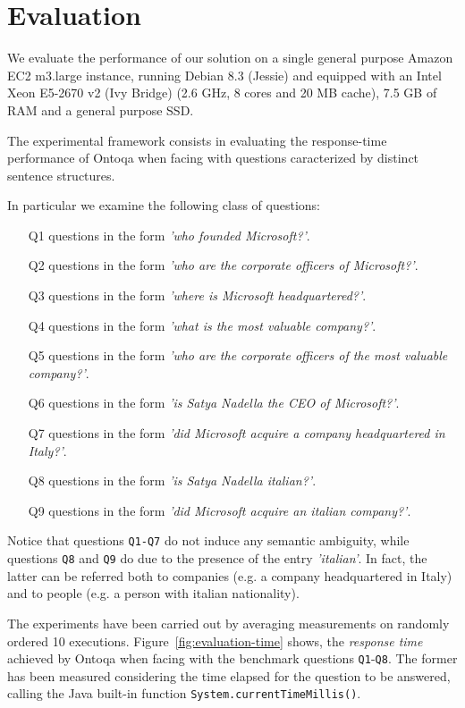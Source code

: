 \section{Evaluation}
\label{sec:evaluation}
We evaluate the performance of our solution on a single general purpose
Amazon EC2 m3.large instance, running Debian 8.3 (Jessie)
and equipped with an Intel Xeon E5-2670 v2 (Ivy Bridge)  (2.6 GHz,
8 cores and 20 MB cache), 7.5 GB of RAM and a general purpose SSD.

The experimental framework consists in evaluating the response-time performance of Ontoqa when facing with questions caracterized by distinct sentence structures.

In particular we examine the following class of questions:

\begin{itemize}
	\item[Q1] questions in the form \textit{'who founded Microsoft?'}.
	\item[Q2] questions in the form \textit{'who are the corporate officers of Microsoft?'}.
	\item[Q3] questions in the form \textit{'where is Microsoft headquartered?'}.
	\item[Q4] questions in the form \textit{'what is the most valuable company?'}.
	\item[Q5] questions in the form \textit{'who are the corporate officers of the most valuable company?'}.
	\item[Q6] questions in the form \textit{'is Satya Nadella the CEO of Microsoft?'}.
	\item[Q7] questions in the form \textit{'did Microsoft acquire a company headquartered in Italy?'}.
	\item[Q8] questions in the form \textit{'is Satya Nadella italian?'}.
	\item[Q9] questions in the form \textit{'did Microsoft acquire an italian company?'}.
\end{itemize}

Notice that questions \texttt{Q1-Q7} do not induce any semantic ambiguity, while questions \texttt{Q8} and \texttt{Q9} do due to the presence of the entry \textit{'italian'}. In fact, the latter can be referred both to companies (e.g. a company headquartered in Italy) and to people (e.g. a person with italian nationality).

The experiments have been carried out by averaging measurements on randomly ordered 10 executions.
%
Figure~\ref{fig:evaluation-time} shows, the \textit{response time} achieved by Ontoqa when facing with the benchmark questions \texttt{Q1}-\texttt{Q8}.
%
The former has been measured considering the time elapsed for the question to be answered, calling the Java built-in function \texttt{System.currentTimeMillis()}.
%

